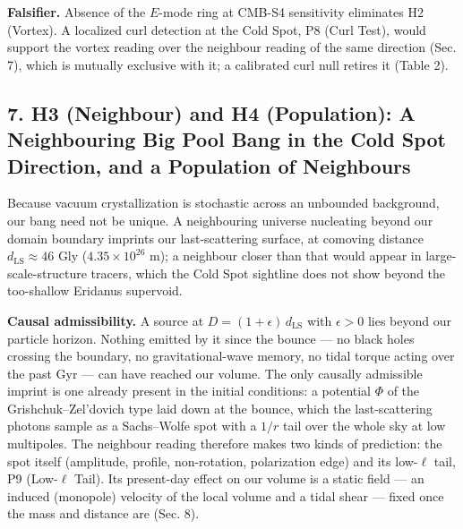 \documentclass[
]{article}
\begin{document}
\textbf{Falsifier.} Absence of the \(E\)-mode ring at CMB-S4 sensitivity
eliminates H2 (Vortex). A localized curl detection at the Cold Spot, P8
(Curl Test), would support the vortex reading over the neighbour reading
of the same direction (Sec. 7), which is mutually exclusive with it; a
calibrated curl null retires it (Table 2).

\hypertarget{h3-neighbour-and-h4-population-a-neighbouring-big-pool-bang-in-the-cold-spot-direction-and-a-population-of-neighbours}{%
\subsection{\texorpdfstring{\textbf{7. H3 (Neighbour) and H4
(Population): A Neighbouring Big Pool Bang in the Cold Spot Direction,
and a Population of
Neighbours}}{7. H3 (Neighbour) and H4 (Population): A Neighbouring Big Pool Bang in the Cold Spot Direction, and a Population of Neighbours}}\label{h3-neighbour-and-h4-population-a-neighbouring-big-pool-bang-in-the-cold-spot-direction-and-a-population-of-neighbours}}

Because vacuum crystallization is stochastic across an unbounded
background, our bang need not be unique. A neighbouring universe
nucleating beyond our domain boundary imprints our last-scattering
surface, at comoving distance \(d_{\text{LS}} \approx 46\) Gly
(\(4.35\times10^{26}\) m); a neighbour closer than that would appear in
large-scale-structure tracers, which the Cold Spot sightline does not
show beyond the too-shallow Eridanus supervoid.

\textbf{Causal admissibility.} A source at
\(D = (1+\epsilon)\,d_{\text{LS}}\) with \(\epsilon > 0\) lies beyond
our particle horizon. Nothing emitted by it since the bounce --- no
black holes crossing the boundary, no gravitational-wave memory, no
tidal torque acting over the past Gyr --- can have reached our volume.
The only causally admissible imprint is one already present in the
initial conditions: a potential \(\Phi\) of the Grishchuk--Zel'dovich
type laid down at the bounce, which the last-scattering photons sample
as a Sachs--Wolfe spot with a \(1/r\) tail over the whole sky at low
multipoles. The neighbour reading therefore makes two kinds of
prediction: the spot itself (amplitude, profile, non-rotation,
polarization edge) and its low-\(\ell\) tail, P9 (Low-\(\ell\) Tail).
Its present-day effect on our volume is a static field --- an induced
(monopole) velocity of the local volume and a tidal shear --- fixed once
the mass and distance are (Sec. 8).
\end{document}
